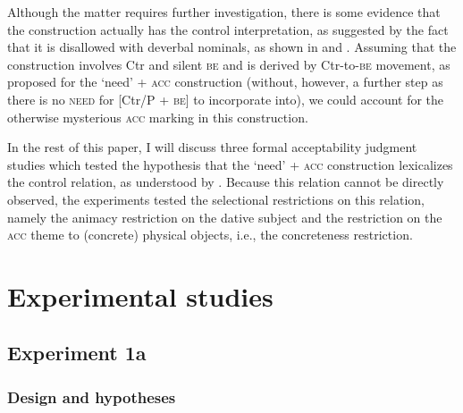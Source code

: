 \documentclass[output=paper,colorlinks,citecolor=brown]{langscibook}
\begin{document}
\noindent Although the matter requires further investigation, there is some evidence that the construction actually has the control interpretation, as suggested by the fact that it is disallowed with deverbal nominals, as shown in  and . Assuming that the construction involves Ctr and silent \textsc{be} and is derived by Ctr-to-\textsc{be} movement, as proposed for the `need' + \textsc{acc} construction (without, however, a further step as there is no \textsc{need} for [Ctr/P + \textsc{be}] to incorporate into), we could account for the otherwise mysterious \textsc{acc} marking in this construction.

\ea
{}
\z\z

\noindent In the rest of this paper, I will discuss three formal acceptability judgment studies which tested the hypothesis that the `need' + \textsc{acc} construction lexicalizes the control relation, as understood by \citet{Vikner.Jensen2002}. Because this relation cannot be directly observed, the experiments tested the selectional restrictions on this relation, namely the animacy restriction on the dative subject and the restriction on the \textsc{acc} theme to (concrete) physical objects, i.e., the concreteness restriction.

\section{Experimental studies\label{section-experiments}}

\subsection{Experiment 1a}

\subsubsection{Design and hypotheses}
\end{document}
